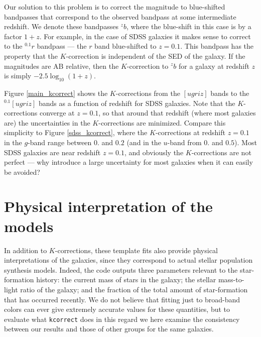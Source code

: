 \documentclass[12pt,preprint]{aastex}
\newcommand{\band}[2]{\ensuremath{^{{#1}}\!{#2}}}
\begin{document}
Our solution to this problem is to correct the magnitude to
blue-shifted bandpasses that correspond to the observed bandpass at
some intermediate redshift. We denote these bandpasses \band{z}{b},
where the blue-shift in this case is by a factor $1+z$. For example,
in the case of SDSS galaxies it makes sense to correct to the
\band{0.1}{r} bandpass --- the $r$ band blue-shifted to $z=0.1$. This
bandpass has the property that the $K$-correction is independent of
the SED of the galaxy. If the magnitudes are AB relative, then the
$K$-correction to \band{z}{b} for a galaxy at redshift $z$ is simply
$-2.5\log_{10} (1+z)$.

Figure \ref{main_kcorrect} shows the $K$-corrections from the
$[ugriz]$ bands to the $\band{0.1}{[ugriz]}$ bands as a function of
redshift for SDSS galaxies. Note that the $K$-corrections converge at
$z=0.1$, so that around that redshift (where most galaxies are) the
uncertainties in the $K$-corrections are minimized. Compare this
simplicity to Figure \ref{sdss_kcorrect}, where the $K$-corrections at
redshift $z=0.1$ in the $g$-band range between $0.$ and $0.2$ (and in
the $u$-band from $0.$ and $0.5$). Most SDSS galaxies are near
redshift $z=0.1$, and obviously the $K$-corrections are not perfect
--- why introduce a large uncertainty for most galaxies when it can
easily be avoided?

\section{Physical interpretation of the models}
\label{physical}

In addition to $K$-corrections, these template fits also provide
physical interpretations of the galaxies, since they correspond to
actual stellar population synthesis models. Indeed, the code outputs
three parameters relevant to the star-formation history: the current
mass of stars in the galaxy; the stellar mass-to-light ratio of the
galaxy; and the fraction of the total amount of star-formation that
has occurred recently. We do not believe that fitting just to
broad-band colors can ever give extremely accurate values for these
quantities, but to evaluate what {\tt kcorrect} does in this regard we
here examine the consistency between our results and those of other
groups for the same galaxies.
\end{document}
